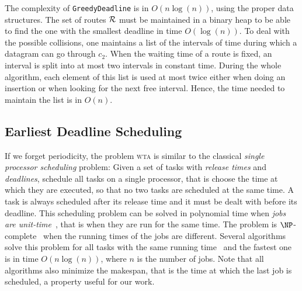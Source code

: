 \documentclass[a4paper,10pt]{journal}
\newcommand\greedydeadline{\texttt{GreedyDeadline}\xspace}
\newcommand\wta{\textsc{wta}\xspace}
\begin{document}
       
      

   


    The complexity of \greedydeadline is in $O(n\log(n))$, using the proper data structures. The set of routes $\cal{R}$ must be maintained in a binary heap to be able to find the one with the smallest deadline in time $O(\log(n))$. To deal with the possible collisions, one maintains a list of the intervals
    of time during which a datagram can go through $c_2$. When the waiting time of a route is fixed, an interval is split into at most two intervals in constant time. During the whole algorithm, each element of this list is used at most twice either when doing an insertion or when looking for the next free interval. Hence, the time needed to maintain the list is in $O(n)$. 
  
     \subsection{Earliest Deadline Scheduling}\label{sec:wtaheuristic}
     
     
     If we forget periodicity, the problem \wta is similar to the classical \emph{single processor scheduling} problem: Given a set of tasks with \emph{release times} and \emph{deadlines}, schedule all tasks on a single processor, that is choose the time at which they are executed, so that no two tasks are scheduled at the same time. A task is always scheduled after its release time and it must be dealt with before its deadline. This scheduling problem can be solved in polynomial time when \emph{jobs are unit-time}~\cite{simons1978fast}, that is when they are run for the same time.
     The problem is $\NP$-complete~\cite{lenstra1977complexity} when the running times of the jobs are different. Several algorithms solve this problem
     for all tasks with the same running time~\cite{simons1978fast,carlier1979probleme,garey1981scheduling} and the fastest one is in time $O(n\log(n))$, where $n$ is the number of jobs.
     Note that all algorithms also minimize the makespan, that is the time at which the last job is scheduled, a property useful for our work. 
\end{document}
